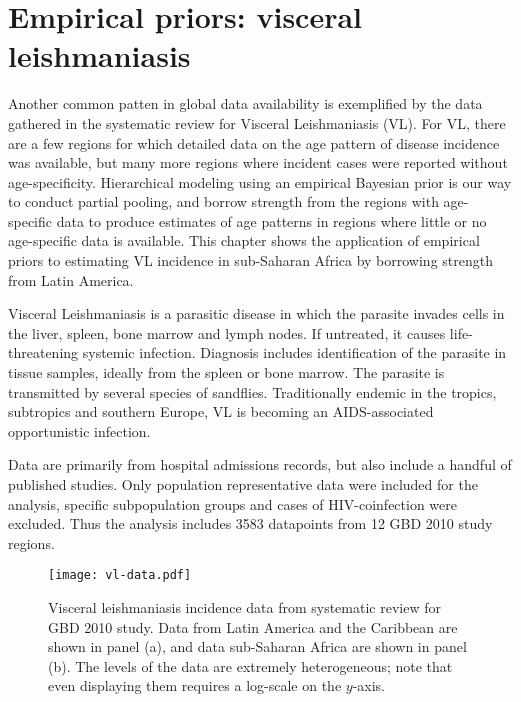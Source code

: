 \chapter{Empirical priors: visceral leishmaniasis}
\label{applications-priors_empirical}

Another common patten in global data availability is exemplified by
the data gathered in the systematic review for Visceral Leishmaniasis
(VL).  For VL, there are a few regions for which detailed data on the
age pattern of disease incidence was available, but many more regions
where incident cases were reported without age-specificity.
Hierarchical modeling using an empirical Bayesian prior is our way to
conduct partial pooling, and borrow strength from the regions with
age-specific data to produce estimates of age patterns in regions
where little or no age-specific data is available.  This chapter shows
the application of empirical priors to estimating VL incidence in
sub-Saharan Africa by borrowing strength from Latin America.

Visceral Leishmaniasis is a parasitic disease in which the parasite
invades cells in the liver, spleen, bone marrow and lymph nodes.  If
untreated, it causes life-threatening systemic infection.  Diagnosis
includes identification of the parasite in tissue samples, ideally
from the spleen or bone marrow.  The parasite is transmitted by
several species of sandflies.  Traditionally endemic in the tropics,
subtropics and southern Europe, VL is becoming an AIDS-associated
opportunistic infection. \cite{herwaldt_leishmaniasis_1999,
baron_medical_1996}

Data are primarily from hospital admissions records, but also include
a handful of published studies.  Only population
representative data were included for the analysis, specific
subpopulation groups and cases of HIV-coinfection were excluded.  Thus
the analysis includes 3583 datapoints from 12 GBD 2010 study regions.

    \begin{figure}[h]
        \begin{center}
            \texttt{[image: vl-data.pdf]}
            \caption{Visceral leishmaniasis incidence data from
              systematic review for GBD 2010 study.  Data from Latin
              America and the Caribbean are shown in panel (a), and
              data sub-Saharan Africa are shown in panel (b).  The
              levels of the data are extremely heterogeneous; note
              that even displaying them requires a log-scale on the
              $y$-axis.}
            \label{fig:app-vl data}
        \end{center}
    \end{figure}

